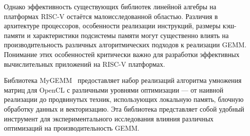 Однако эффективность существующих библиотек линейной алгебры на платформах RISC-V остаётся малоисследованной областью. Различия в архитектуре процессоров, особенности реализации инструкций, размеры кэш-памяти и характеристики подсистемы памяти могут существенно влиять на производительность различных алгоритмических подходов к реализации GEMM. Понимание этих особенностей критически важно для разработки эффективных вычислительных приложений на RISC-V платформах.

Библиотека MyGEMM~\cite{nugteren2018mygemm} предоставляет набор реализаций алгоритма умножения матриц для OpenCL с различными уровнями оптимизации --- от наивной реализации до продвинутых техник, использующих локальную память, блочную обработку данных и векторизацию. Эта библиотека представляет собой удобный инструмент для экспериментального исследования влияния различных оптимизаций на производительность GEMM.